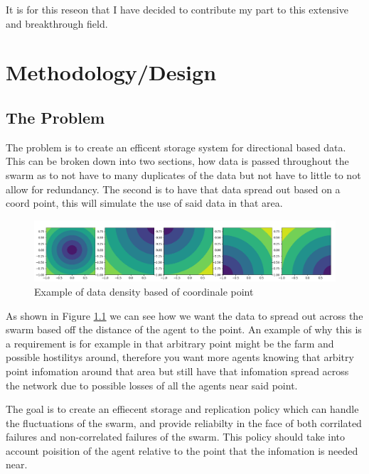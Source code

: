 \documentclass{UoYCSproject}
\begin{document}
It is for this reseon that I have decided to contribute my part to this extensive and breakthrough field.


\chapter{Methodology/Design}
\label{cha:Methodology/Design}


\section{The Problem}
\label{sec:Problem}

The problem is to create an efficent storage system for directional based data.
This can be broken down into two sections, how data is passed throughout the swarm as to not have to many duplicates of the data but not have to little to not allow for redundancy.
The second is to have that data spread out based on a coord point, this will simulate the use of said data in that area.

\begin{figure}[htb]
\label{fig:popdensity}
\begin{center}
\centering
\includegraphics[width=\linewidth]{"./Memory_Pop_Density.png"}
\caption{Example of data density based of coordinale point}
\end{center}
\end{figure}

As shown in Figure \ref{fig:popdensity} we can see how we want the data to spread out across the swarm based off the distance of the agent to the point.
An example of why this is a requirement is for example in that arbitrary point might be the farm and possible hostilitys around, therefore you want more agents knowing that arbitry point infomation around that area but still have that infomation spread across the network due to possible losses of all the agents near said point.

The goal is to create an effiecent storage and replication policy which can handle the fluctuations of the swarm, and provide reliabilty in the face of both corrilated failures and non-correlated failures of the swarm.
This policy should take into account poisition of the agent relative to the point that the infomation is needed near.
\end{document}
